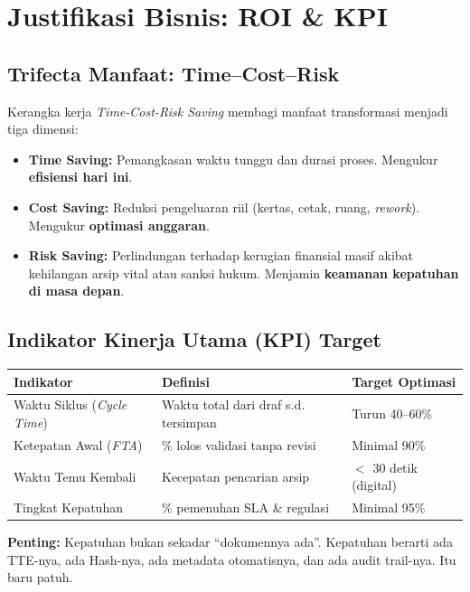 \documentclass[11pt,a4paper]{article}
\begin{document}
\newpage

\section{Justifikasi Bisnis: ROI \& KPI}

\subsection{Trifecta Manfaat: Time--Cost--Risk}
Kerangka kerja \textit{Time-Cost-Risk Saving} membagi manfaat transformasi menjadi tiga dimensi:
\begin{itemize}
    \item \textbf{Time Saving:} Pemangkasan waktu tunggu dan durasi proses. Mengukur \textbf{efisiensi hari ini}.
    \item \textbf{Cost Saving:} Reduksi pengeluaran riil (kertas, cetak, ruang, \textit{rework}). Mengukur \textbf{optimasi anggaran}.
    \item \textbf{Risk Saving:} Perlindungan terhadap kerugian finansial masif akibat kehilangan arsip vital atau sanksi hukum. Menjamin \textbf{keamanan kepatuhan di masa depan}.
\end{itemize}

\subsection{Indikator Kinerja Utama (KPI) Target}
\begin{table}[h!]
\centering\small
\begin{tabularx}{\textwidth}{@{} X X X @{}}
\toprule
\textbf{Indikator} & \textbf{Definisi} & \textbf{Target Optimasi} \\
\midrule
Waktu Siklus (\textit{Cycle Time}) & Waktu total dari draf s.d. tersimpan & Turun 40--60\% \\
Ketepatan Awal (\textit{FTA}) & \% lolos validasi tanpa revisi & Minimal 90\% \\
Waktu Temu Kembali & Kecepatan pencarian arsip & $<$ 30 detik (digital) \\
Tingkat Kepatuhan & \% pemenuhan SLA \& regulasi & Minimal 95\% \\
\bottomrule
\end{tabularx}
\end{table}

\textbf{Penting:} Kepatuhan bukan sekadar ``dokumennya ada''. Kepatuhan berarti ada TTE-nya, ada Hash-nya, ada metadata otomatisnya, dan ada audit trail-nya. Itu baru patuh.
\end{document}
